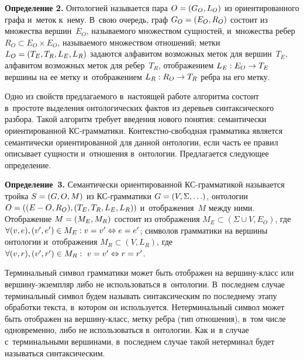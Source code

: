 \begin{multicols}{2}
  \smallskip
  
  \noindent
  \textbf{Определение 2.} Онтологией называется пара $O\hm= (G_O,L_O)$ из 
ориентированного графа и~меток к~нему. В~свою очередь, граф 
$G_O\hm=(E_O,R_O)$ состоит из множества вершин~$E_O$, называемого 
множеством сущностей, и~множества ребер $R_O\subset E_O\times E_O$, 
называемого множеством отношений; метки $L_O\hm= (T_E, T_R, L_E, L_R)$ 
задаются алфавитом возможных меток для вершин~$T_E$, алфавитом 
возможных меток для ребер~$T_R$, отображением $L_E: E_O\hm\to T_E$ 
вершины на ее метку и~отображением $L_R: R_O\hm\to T_R$ ребра на его 
метку.

  \smallskip
  
  Одно из свойств предлагаемого в~настоящей работе алгоритма состоит 
в~простоте выделения онтологических фактов из деревьев синтаксического 
разбора. Такой алгоритм требует введения нового понятия: семантически 
ориентированной КС-грам\-ма\-ти\-ки. Контекстно-свободная грам\-ма\-ти\-ка является 
семантически ориентированной для данной онтологии, если часть ее правил 
описывает сущности и~отношения в~онтологии. Предлагается следующее 
определение.
  
  \smallskip
  
  \noindent
  \textbf{Определение~3.} Семантически ориентированной  
КС-грамматикой называется тройка $S\hm=(G,O,M)$ 
из КС-грам\-ма\-ти\-ки $G\hm=(V,\Sigma,\ldots)$, 
онтологии $O\hm= ((E-O, R_O), (T_E, T_R, L_E, L_R))$ и~отображения~$M$ 
между ними. Отображение $M\hm= (M_E, M_R)$ состоит из отображения 
$M_E\subset (\Sigma \cup V, E_O)$, где $\forall (v,e), (v^\prime, e^\prime)\hm\in 
M_E: v\hm= v^\prime \Leftrightarrow e\hm=e^\prime$; символов грамматики на 
вершины онтологии и~отображения $M_R\subset (V,L_R)$, где $\forall (v,r), 
(v^\prime, r^\prime)\hm\in M_R:\ v\hm=v^\prime\Leftrightarrow r\hm=r^\prime$.

  \smallskip
  
  Терминальный символ грамматики может быть отображен на  
вер\-ши\-ну-класс или вершину-эк\-земп\-ляр либо не использоваться в~онтологии. 
В~последнем случае терминальный символ будем называть синтаксическим по 
последнему этапу обработки текста, в~котором он используется. 
Нетерминальный символ может быть отображен на вер\-ши\-ну-класс, метку 
ребра (тип отношения), в~том числе одновременно, либо не использоваться 
в~онтологии. Как и~в случае с~терминальными вершинами, в~последнем случае 
такой нетерминал будет называться синтаксическим.



\end{multicols}
